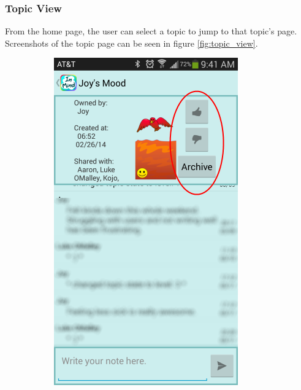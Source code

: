       \subsubsection{Topic View}
      From the home page,
      the user can select a topic to jump to that topic's page.
      Screenshots of the topic page can be seen in figure \ref{fig:topic_view}.

    \begin{figure}
      \caption{\textbf{Topic View} --
          Topic views show the topic's current status icon,
          controls available to the user,
          and messages that have been left under that topic.
          Messages have been blurred, and controls are circled in red.
          (a) If you own a topic, you can adjust its status.
          (b) On someone else's topic, you can leave a smile.
          (c) You can see only your own archived topics,
          and you can bring them back from the archive
          and read the messages attached to it.}
      \centering
      \begin{subfigure}[b]{0.3\textwidth}
        \includegraphics[width=\textwidth]{topic_view_mine.png}

\end{subfigure}
\end{figure}
